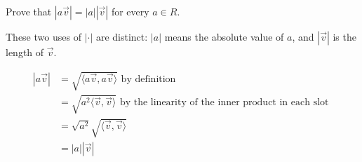 \documentclass{article}
\newcommand{\R}{R}
\newenvironment{warning}{}{}
\newenvironment{free-response}{}{}
\begin{document}
Prove that $|a\vec{v}| = |a| |\vec{v}|$ for every $a \in \R$. 

\begin{warning}
  These two uses of $|\cdot|$ are distinct: $|a|$ means the absolute
  value of $a$, and $|\vec{v}|$ is the length of $\vec{v}$.
\end{warning}

\begin{free-response}
  \begin{align*}
    |a\vec{v}|
    &= \sqrt{\langle a\vec{v},a\vec{v}\rangle} \text{ by definition}\\
    &= \sqrt{a^2\langle \vec{v},\vec{v}\rangle} \text{ by the linearity of the inner product in each slot }\\
    &= \sqrt{a^2} \sqrt{\langle \vec{v},\vec{v}\rangle}\\
    &= |a| |\vec{v}|
  \end{align*}
\end{free-response}
\end{document}
